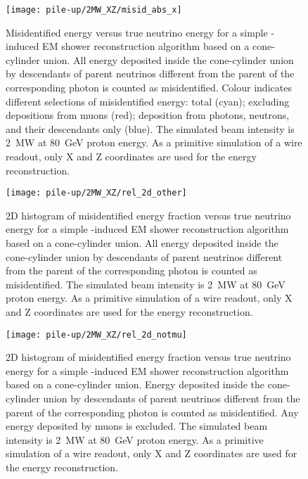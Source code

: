 \begin{figure}[htb]
	\centering
	\texttt{[image: pile-up/2MW\_XZ/misid\_abs\_x]}
	\caption{Misidentified energy versus true neutrino energy for a simple \Pgpz-induced EM shower reconstruction algorithm based on a cone-cylinder union.
		All energy deposited inside the cone-cylinder union by descendants of parent neutrinos different from the parent of the corresponding \Pgpz photon is counted as misidentified.
		Colour indicates different selections of misidentified energy: total (cyan); excluding depositions from muons (red); deposition from photons, neutrons, and their descendants only (blue).
		The simulated beam intensity is \SI{2}{\mega\watt} at \SI{80}{\giga\electronvolt} proton energy.
		As a primitive simulation of a wire readout, only X and Z coordinates are used for the energy reconstruction.}
\end{figure}

\begin{figure}[htb]
	\centering
	\texttt{[image: pile-up/2MW\_XZ/rel\_2d\_other]}
	\caption{2D histogram of misidentified energy fraction versus true neutrino energy for a simple \Pgpz-induced EM shower reconstruction algorithm based on a cone-cylinder union.
		All energy deposited inside the cone-cylinder union by descendants of parent neutrinos different from the parent of the corresponding \Pgpz photon is counted as misidentified.
		The simulated beam intensity is \SI{2}{\mega\watt} at \SI{80}{\giga\electronvolt} proton energy.
		As a primitive simulation of a wire readout, only X and Z coordinates are used for the energy reconstruction.}
\end{figure}

\begin{figure}[htb]
	\centering
	\texttt{[image: pile-up/2MW\_XZ/rel\_2d\_notmu]}
	\caption{2D histogram of misidentified energy fraction versus true neutrino energy for a simple \Pgpz-induced EM shower reconstruction algorithm based on a cone-cylinder union.
		Energy deposited inside the cone-cylinder union by descendants of parent neutrinos different from the parent of the corresponding \Pgpz photon is counted as misidentified.
		Any energy deposited by muons is excluded.
		The simulated beam intensity is \SI{2}{\mega\watt} at \SI{80}{\giga\electronvolt} proton energy.
		As a primitive simulation of a wire readout, only X and Z coordinates are used for the energy reconstruction.}
\end{figure}

